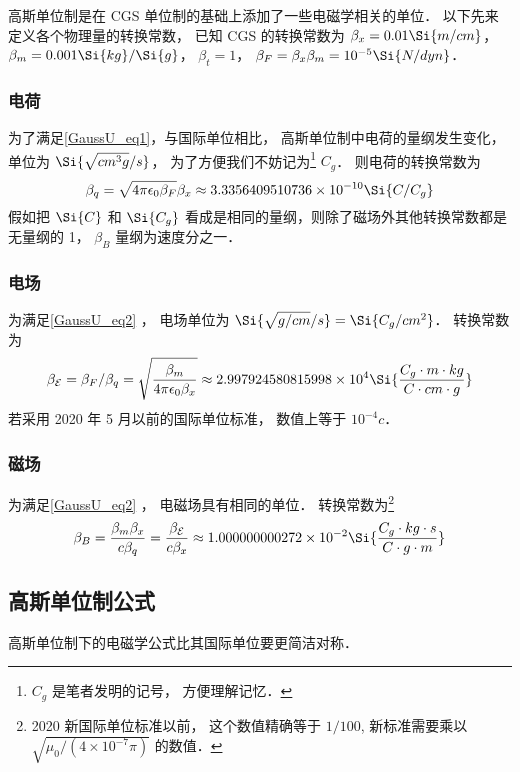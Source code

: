 

高斯单位制是在 CGS 单位制的基础上添加了一些电磁学相关的单位． 以下先来定义各个物理量的转换常数， 
已知 CGS 的转换常数为 $\beta_x = 0.01\Si{m/cm}$， $\beta_m = 0.001\Si{kg}/\Si{g}$， $\beta_t = 1$， $\beta_F = \beta_x \beta_m = 10^{-5}\Si{N/dyn}$．

\subsubsection{电荷}
为了满足\autoref{GaussU_eq1}，与国际单位相比， 高斯单位制中电荷的量纲发生变化， 单位为 $\Si{\sqrt{cm^3 g}/s}$， 为了方便我们不妨记为\footnote{$C_g$ 是笔者发明的记号， 方便理解记忆．} $C_g$． 则电荷的转换常数为
\begin{equation}
\beta_q = \sqrt{4\pi\epsilon_0\beta_F} \beta_x \approx 3.3356409510736\times 10^{-10} \Si{C/C_g}
\end{equation}
假如把 $\Si{C}$ 和 $\Si{C_g}$ 看成是相同的量纲，则除了磁场外其他转换常数都是无量纲的 1， $\beta_B$ 量纲为速度分之一．

\subsubsection{电场}
为满足\autoref{GaussU_eq2} ， 电场单位为 $\Si{\sqrt{g/cm}/s} = \Si{C_g/cm^2}$． 转换常数为
\begin{equation}
\beta_{\mathcal E} = \beta_F/\beta_q = \sqrt{\frac{\beta_m}{4\pi\epsilon_0 \beta_x}} \approx 2.997924580815998\times 10^4 \Si{\frac{C_g\cdot m\cdot kg}{C\cdot cm\cdot g}}
\end{equation}
若采用 2020 年 5 月以前的国际单位标准， 数值上等于 $10^{-4} c$．

\subsubsection{磁场}
为满足\autoref{GaussU_eq2} ， 电磁场具有相同的单位． 转换常数为\footnote{2020 新国际单位标准以前， 这个数值精确等于 $1/100$, 新标准需要乘以 $\sqrt{\mu_0/(4\times 10^{-7}\pi)}$ 的数值．}
\begin{equation}
\beta_B = \frac{\beta_m\beta_x}{c\beta_q} = \frac{\beta_{\mathcal E}}{c\beta_x} \approx 1.000000000272\times 10^{-2} \Si{\frac{C_g\cdot kg \cdot s}{C \cdot g \cdot m}}
\end{equation}

\subsection{高斯单位制公式}
高斯单位制下的电磁学公式比其国际单位要更简洁对称．

